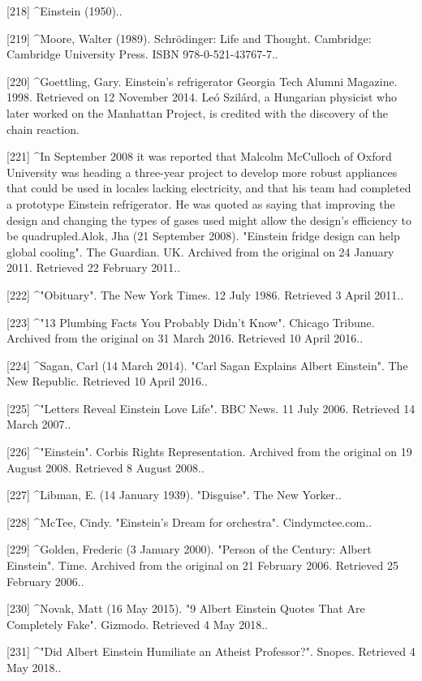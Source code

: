 [218]
^Einstein (1950)..

[219]
^Moore, Walter (1989). Schrödinger: Life and Thought. Cambridge: Cambridge University Press. ISBN 978-0-521-43767-7..

[220]
^Goettling, Gary. Einstein's refrigerator Georgia Tech Alumni Magazine. 1998. Retrieved on 12 November 2014. Leó Szilárd, a Hungarian physicist who later worked on the Manhattan Project, is credited with the discovery of the chain reaction.

[221]
^In September 2008 it was reported that Malcolm McCulloch of Oxford University was heading a three-year project to develop more robust appliances that could be used in locales lacking electricity, and that his team had completed a prototype Einstein refrigerator. He was quoted as saying that improving the design and changing the types of gases used might allow the design's efficiency to be quadrupled.Alok, Jha (21 September 2008). "Einstein fridge design can help global cooling". The Guardian. UK. Archived from the original on 24 January 2011. Retrieved 22 February 2011..

[222]
^"Obituary". The New York Times. 12 July 1986. Retrieved 3 April 2011..

[223]
^"13 Plumbing Facts You Probably Didn't Know". Chicago Tribune. Archived from the original on 31 March 2016. Retrieved 10 April 2016..

[224]
^Sagan, Carl (14 March 2014). "Carl Sagan Explains Albert Einstein". The New Republic. Retrieved 10 April 2016..

[225]
^"Letters Reveal Einstein Love Life". BBC News. 11 July 2006. Retrieved 14 March 2007..

[226]
^"Einstein". Corbis Rights Representation. Archived from the original on 19 August 2008. Retrieved 8 August 2008..

[227]
^Libman, E. (14 January 1939). "Disguise". The New Yorker..

[228]
^McTee, Cindy. "Einstein's Dream for orchestra". Cindymctee.com..

[229]
^Golden, Frederic (3 January 2000). "Person of the Century: Albert Einstein". Time. Archived from the original on 21 February 2006. Retrieved 25 February 2006..

[230]
^Novak, Matt (16 May 2015). "9 Albert Einstein Quotes That Are Completely Fake". Gizmodo. Retrieved 4 May 2018..

[231]
^"Did Albert Einstein Humiliate an Atheist Professor?". Snopes. Retrieved 4 May 2018..